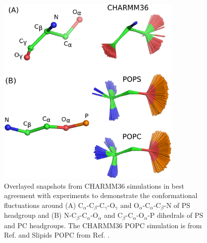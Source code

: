 \documentclass[aps,prl,superscriptaddress,twocolumn]{revtex4}
\begin{document}
\begin{figure}[]
  \centering
  \includegraphics[width=9.0cm]{../Figs/structures.eps}
  \caption{\label{HGstructuresPSandPC}
    Overlayed snapshots from CHARMM36 simulations in best agreement with experiments
    to demonstrate the conformational fluctuations around
    (A) C$_\alpha$-C$_\beta$-C$_\gamma$-O$_\gamma$ and  O$_\alpha$-C$_\alpha$-C$_\beta$-N
    of PS headgroup and (B) N-C$_\beta$-C$_\alpha$-O$_\alpha$ and C$_\beta$-C$_\alpha$-O$_\alpha$-P
    dihedrals of PS and PC headgroups.
    The CHARMM36 POPC simulation is from Ref.  and Slipids POPC from Ref. .
  }
\end{figure}
\end{document}
